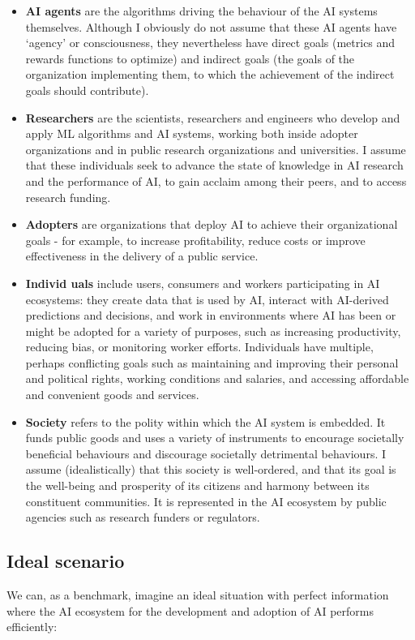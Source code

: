 \documentclass[11pt]{article}
\begin{document}
\begin{itemize}
    \item \textbf{AI agents} are the algorithms driving the behaviour of the AI systems themselves. Although I obviously do not assume that these AI agents have `agency' or consciousness, they nevertheless have direct goals (metrics and rewards functions to optimize) and indirect goals (the goals of the organization implementing them, to which the achievement of the indirect goals should contribute).
    \item \textbf{Researchers} are the scientists, researchers and engineers who develop and apply ML algorithms and AI systems, working both inside adopter organizations and in public research organizations and universities. I assume that these individuals seek to advance the state of knowledge in AI research and the performance of AI, to gain acclaim among their peers, and to access research funding.
    \item \textbf{Adopters} are organizations that deploy AI to achieve their organizational goals - for example, to increase profitability, reduce costs or improve effectiveness in the delivery of a public service.
    \item \textbf{Individ uals} include users, consumers and workers participating in AI ecosystems: they create data that is used by AI, interact with AI-derived predictions and decisions, and work in environments where AI has been or might be adopted for a variety of purposes, such as increasing productivity, reducing bias, or monitoring worker efforts. Individuals have multiple, perhaps conflicting goals such as maintaining and improving their personal and political rights, working conditions and salaries, and accessing affordable and convenient goods and services.
    \item \textbf{Society} refers to the polity within which the AI system is embedded. It funds public goods and uses a variety of instruments to encourage societally beneficial behaviours and discourage societally detrimental behaviours. I assume (idealistically) that this society is well-ordered, and that its goal is the well-being and prosperity of its citizens and harmony between its constituent communities. It is represented in the AI ecosystem by public agencies such as research funders or regulators. 
\end{itemize}

\subsection{Ideal scenario}
We can, as a benchmark, imagine an ideal situation with perfect information where the AI ecosystem for the development and adoption of AI performs efficiently: 
\end{document}
